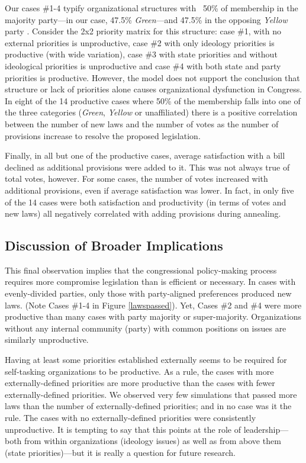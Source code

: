 \documentclass[pdftex,12pt]{llncs}
\begin{document}
Our cases \#1-4 typify organizational structures with ~50\% of membership in the majority party---in our case, 47.5\% \textit{Green}---and 47.5\% in the opposing \textit{Yellow} party .
Consider the {2x2} priority matrix for this structure: case \#1, with no external priorities is unproductive, case \#2 with only ideology priorities is productive (with wide variation), case \#3 with state priorities and without ideological priorities is unproductive and case \#4 with both state and party priorities is productive. 
However, the model does not support the conclusion that structure or lack of priorities alone causes organizational dysfunction in Congress.
In eight of the 14 productive cases where 50\% of the membership falls into one of the three categories (\textit{Green}, \textit{Yellow} or unaffiliated) there is a positive correlation between the number of new laws and the number of votes as the number of provisions increase to resolve the proposed legislation.   

Finally, in all but one of the productive cases, average satisfaction with a bill declined as additional provisions were added to it. 
This was not always true of total votes, however.
For some cases, the number of votes increased with additional provisions, even if average satisfaction was lower. 
In fact, in only five of the 14 cases were both satisfaction and productivity (in terms of votes and new laws) all negatively correlated with adding provisions during annealing. 
 
\subsection{Discussion of Broader Implications}
This final observation implies that the congressional policy-making process requires more compromise legislation than is efficient or necessary. 
In cases with evenly-divided parties, only those with party-aligned preferences produced new laws. 
(Note Cases \#1-4 in Figure \ref{lawspassed}). 
Yet, Cases \#2 and \#4 were more productive than many cases with party majority or super-majority.  
Organizations without any internal community (party) with common positions on issues are similarly unproductive.

Having at least some priorities established externally seems to be required for self-tasking organizations to be productive. 
As a rule, the cases with more externally-defined priorities are more productive than the cases with fewer externally-defined priorities. 
We observed very few simulations that passed more laws than the number of externally-defined priorities; and in no case was it the rule. 
The cases with no externally-defined priorities were consistently unproductive. 
It is tempting to say that this points at the role of leadership---both from within organizations (ideology issues) as well as from above them (state priorities)---but it is really a question for future research.  
\end{document}
